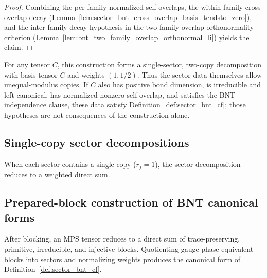 \begin{proof}\leanok
    Combining the per-family normalized self-overlaps, the within-family
    cross-overlap decay
    (Lemma~\ref{lem:sector_bnt_cross_overlap_basis_tendsto_zero}), and the
    inter-family decay hypothesis in the two-family overlap-orthonormality
    criterion (Lemma~\ref{lem:bnt_two_family_overlap_orthonormal_li}) yields
    the claim.
\end{proof}

\begin{example}%
    \label{ex:sector_bnt_halvedDecomp}
    \leanok
    For any tensor $C$, this construction forms a single-sector, two-copy
    decomposition with basis tensor $C$ and weights $(1,1/2)$. Thus the
    sector data themselves allow unequal-modulus copies. If $C$ also
    has positive bond dimension, is irreducible and left-canonical, has
    normalized nonzero self-overlap, and satisfies the BNT independence clause,
    these data satisfy Definition~\ref{def:sector_bnt_cf}; those hypotheses are
    not consequences of the construction alone.
\end{example}

\subsection{Single-copy sector decompositions}

When each sector contains a single copy ($r_j = 1$), the sector decomposition
reduces to a weighted direct sum.

\subsection{Prepared-block construction of BNT canonical forms}%
\label{subsec:paperbnt_supplier}

After blocking, an MPS tensor reduces to a direct sum of trace-preserving,
primitive, irreducible, and injective blocks. Quotienting gauge-phase-equivalent
blocks into sectors and normalizing weights produces the canonical form of
Definition~\ref{def:sector_bnt_cf}.

